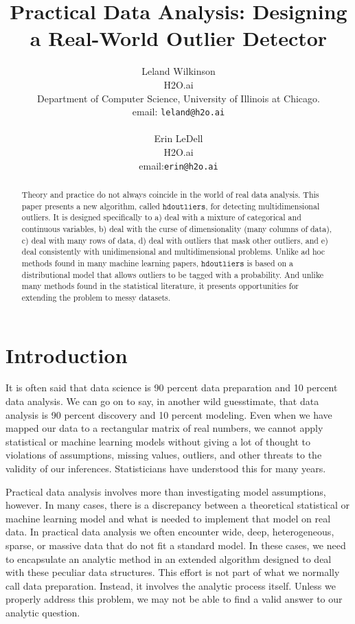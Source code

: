 \documentclass[12pt]{article}
\title{Practical Data Analysis: Designing a Real-World Outlier Detector}
\author{Leland Wilkinson  \\
H2O.ai \\
Department of Computer Science, University of Illinois at Chicago. \\ 
email: \texttt{leland@h2o.ai} \\
\\
Erin LeDell \\
H2O.ai \\
email:\texttt{erin@h2o.ai}
}
\begin{document}
\maketitle

\begin{abstract}
Theory and practice do not always coincide in the world of real data analysis. This paper presents a new algorithm,  called $\mathtt{hdoutliers}$, for detecting multidimensional outliers. It is designed specifically to a) deal with a mixture of categorical and continuous variables, b) deal with the curse of dimensionality (many columns of data), c) deal with many rows of data, d) deal with outliers that mask other outliers, and e) deal consistently with unidimensional and multidimensional problems. Unlike ad hoc methods found in many machine learning papers, $\mathtt{hdoutliers}$ is based on a distributional model that allows outliers to be tagged with a probability. And unlike many methods found in the statistical literature, it presents opportunities for extending the problem to messy datasets.
\end{abstract} %

\section{Introduction}
It is often said that data science is 90 percent data preparation and 10 percent data analysis. We can go on to say, in another wild guesstimate, that data analysis is 90 percent discovery and 10 percent modeling. Even when we have mapped our data to a rectangular matrix of real numbers, we cannot apply statistical or machine learning models without giving a lot of thought to violations of assumptions, missing values, outliers, and other threats to the validity of our inferences. Statisticians have understood this for many years. 

Practical data analysis involves more than investigating model assumptions, however. In many cases, there is a discrepancy between a theoretical statistical or machine learning model and what is needed to implement that model on real data. In practical data analysis we often encounter wide, deep, heterogeneous, sparse, or massive data that do not fit a standard model. In these cases, we need to encapsulate an analytic method in an extended algorithm designed to deal with these peculiar data structures. This effort is not part of what we normally call data preparation. Instead, it involves the analytic process itself. Unless we properly address this problem, we may not be able to find a valid answer to our analytic question.
\end{document}
